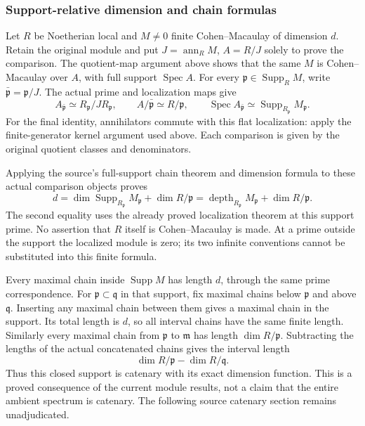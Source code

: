 \subsubsection{Support-relative dimension and chain formulas}\label{support-relative-dimension-and-chain-formulas}

Let \(R\) be Noetherian local and \(M\ne0\) finite Cohen--Macaulay of dimension \(d\). Retain the original module and put \(J=\operatorname{ann}_R M\), \(A=R/J\) solely to prove the comparison. The quotient-map argument above shows that the same \(M\) is Cohen--Macaulay over \(A\), with full support \(\operatorname{Spec}A\). For every \(\mathfrak p\in\operatorname{Supp}_R M\), write \(\bar{\mathfrak p}=\mathfrak p/J\). The actual prime and localization maps give \[
 A_{\bar{\mathfrak p}}\simeq R_{\mathfrak p}/JR_{\mathfrak p},\qquad
 A/\bar{\mathfrak p}\simeq R/\mathfrak p,\qquad
 \operatorname{Spec}A_{\bar{\mathfrak p}}\simeq
 \operatorname{Supp}_{R_{\mathfrak p}}M_{\mathfrak p}.
\] For the final identity, annihilators commute with this flat localization: apply the finite-generator kernel argument used above. Each comparison is given by the original quotient classes and denominators.

Applying the source's full-support chain theorem and dimension formula to these actual comparison objects proves \[
 d=\dim\operatorname{Supp}_{R_{\mathfrak p}}M_{\mathfrak p}
       +\dim R/\mathfrak p
   =\operatorname{depth}_{R_{\mathfrak p}}M_{\mathfrak p}
       +\dim R/\mathfrak p .
\] The second equality uses the already proved localization theorem at this support prime. No assertion that \(R\) itself is Cohen--Macaulay is made. At a prime outside the support the localized module is zero; its two infinite conventions cannot be substituted into this finite formula.

Every maximal chain inside \(\operatorname{Supp}M\) has length \(d\), through the same prime correspondence. For \(\mathfrak p\subset\mathfrak q\) in that support, fix maximal chains below \(\mathfrak p\) and above \(\mathfrak q\). Inserting any maximal chain between them gives a maximal chain in the support. Its total length is \(d\), so all interval chains have the same finite length. Similarly every maximal chain from \(\mathfrak p\) to \(\mathfrak m\) has length \(\dim R/\mathfrak p\). Subtracting the lengths of the actual concatenated chains gives the interval length \[
 \dim R/\mathfrak p-\dim R/\mathfrak q.
\] Thus this closed support is catenary with its exact dimension function. This is a proved consequence of the current module results, not a claim that the entire ambient spectrum is catenary. The following source catenary section remains unadjudicated.

